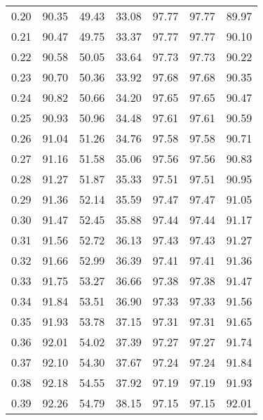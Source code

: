 \begin{tabular}{|c|c|c|c|c|c|c|}
      0.20 &     90.35 &     49.43 &      33.08 &   97.77 &      97.77 &         89.97 \\
      0.21 &     90.47 &     49.75 &      33.37 &   97.77 &      97.77 &         90.10 \\
      0.22 &     90.58 &     50.05 &      33.64 &   97.73 &      97.73 &         90.22 \\
      0.23 &     90.70 &     50.36 &      33.92 &   97.68 &      97.68 &         90.35 \\
      0.24 &     90.82 &     50.66 &      34.20 &   97.65 &      97.65 &         90.47 \\
      0.25 &     90.93 &     50.96 &      34.48 &   97.61 &      97.61 &         90.59 \\
      0.26 &     91.04 &     51.26 &      34.76 &   97.58 &      97.58 &         90.71 \\
      0.27 &     91.16 &     51.58 &      35.06 &   97.56 &      97.56 &         90.83 \\
      0.28 &     91.27 &     51.87 &      35.33 &   97.51 &      97.51 &         90.95 \\
      0.29 &     91.36 &     52.14 &      35.59 &   97.47 &      97.47 &         91.05 \\
      0.30 &     91.47 &     52.45 &      35.88 &   97.44 &      97.44 &         91.17 \\
      0.31 &     91.56 &     52.72 &      36.13 &   97.43 &      97.43 &         91.27 \\
      0.32 &     91.66 &     52.99 &      36.39 &   97.41 &      97.41 &         91.36 \\
      0.33 &     91.75 &     53.27 &      36.66 &   97.38 &      97.38 &         91.47 \\
      0.34 &     91.84 &     53.51 &      36.90 &   97.33 &      97.33 &         91.56 \\
      0.35 &     91.93 &     53.78 &      37.15 &   97.31 &      97.31 &         91.65 \\
      0.36 &     92.01 &     54.02 &      37.39 &   97.27 &      97.27 &         91.74 \\
      0.37 &     92.10 &     54.30 &      37.67 &   97.24 &      97.24 &         91.84 \\
      0.38 &     92.18 &     54.55 &      37.92 &   97.19 &      97.19 &         91.93 \\
      0.39 &     92.26 &     54.79 &      38.15 &   97.15 &      97.15 &         92.01 \\

\end{tabular}
